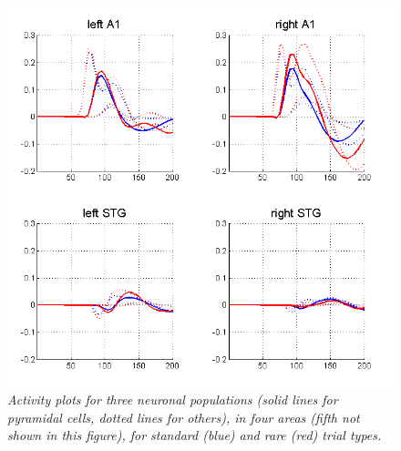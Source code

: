 \begin{figure}
\begin{center}
\includegraphics[width=120mm]{mmn/source_erps}
\caption{\em Activity plots for three neuronal populations (solid lines for pyramidal cells, dotted lines for others), in four areas (fifth not shown in this figure), for standard (blue) and rare (red) trial types.
\label{source_erps} }
\end{center}
\end{figure}


